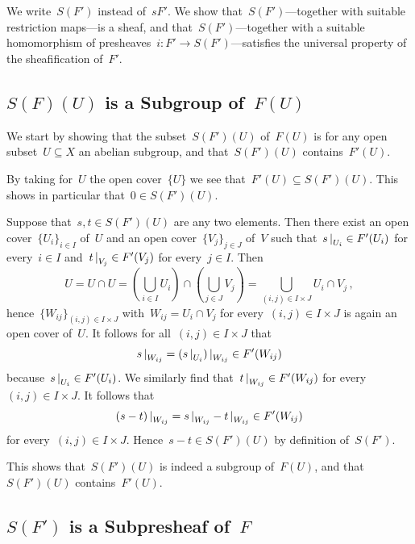\section{}

We write~$S(F')$ instead of~$sF'$.
We show that~$S(F')$---together with suitable restriction maps---is a sheaf, and that~$S(F')$---together with a suitable homomorphism of presheaves~$i \colon F' \to S(F')$---satisfies the universal property of the sheafification of~$F'$.





\subsection*{$S(F)(U)$ is a Subgroup of~$F(U)$}

We start by showing that the subset~$S(F')(U)$ of~$F(U)$ is for any open subset~$U \subseteq X$ an abelian subgroup, and that~$S(F')(U)$ contains~$F'(U)$.

By taking for~$U$ the open cover~$\{U\}$ we see that~$F'(U) \subseteq S(F')(U)$.
This shows in particular that~$0 \in S(F')(U)$.

Suppose that~$s, t \in S(F')(U)$ are any two elements.
Then there exist an open cover~$\{ U_i \}_{i \in I}$ of~$U$ and an open cover~$\{ V_j \}_{j \in J}$ of~$V$ such that~$\restrict{s}{U_i} \in F'(U_i)$ for every~$i \in I$ and~$\restrict{t}{V_j} \in F'(V_j)$ for every~$j \in I$.
Then
\[
    U
  = U \cap U
  = \left( \bigcup_{i \in I} U_i \right) \cap \left( \bigcup_{j \in J} V_j \right)
  = \bigcup_{(i,j) \in I \times J} U_i \cap V_j \,,
\]
hence~$\{ W_{ij} \}_{(i,j) \in I \times J}$ with~$W_{ij} = U_i \cap V_j$ for every~$(i,j) \in I \times J$ is again an open cover of~$U$.
It follows for all~$(i,j) \in I \times J$ that
\[
      \restrict{s}{W_{ij}}
  =   \restrict{(\restrict{s}{U_i})}{W_{ij}}
  \in F'(W_{ij})
\]
because~$\restrict{s}{U_i} \in F'(U_i)$.
We similarly find that~$\restrict{t}{W_{ij}} \in F'(W_{ij})$ for every~$(i,j) \in I \times J$.
It follows that
\[
      \restrict{(s-t)}{W_{ij}}
  =   \restrict{s}{W_{ij}} - \restrict{t}{W_{ij}}
  \in F'(W_{ij})
\]
for every~$(i,j) \in I \times J$.
Hence~$s - t \in S(F')(U)$ by definition of~$S(F')$.

This shows that~$S(F')(U)$ is indeed a subgroup of~$F(U)$, and that~$S(F')(U)$ contains~$F'(U)$.





\subsection*{$S(F')$ is a Subpresheaf of~$F$}

